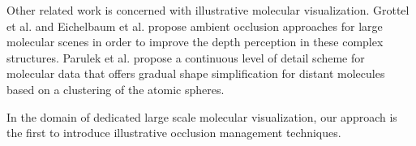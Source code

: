 Other related work is concerned with illustrative molecular visualization. Grottel et al. \cite{grottel12} and Eichelbaum et al. \cite{eichelbaum13} propose ambient occlusion approaches for large molecular scenes in order to improve the depth perception in these complex structures. Parulek et al. \cite{parulek14} propose a continuous level of detail scheme for molecular data that offers gradual shape simplification for distant molecules based on a clustering of the atomic spheres.

In the domain of dedicated large scale molecular visualization, our approach is the first to introduce illustrative occlusion management techniques.
